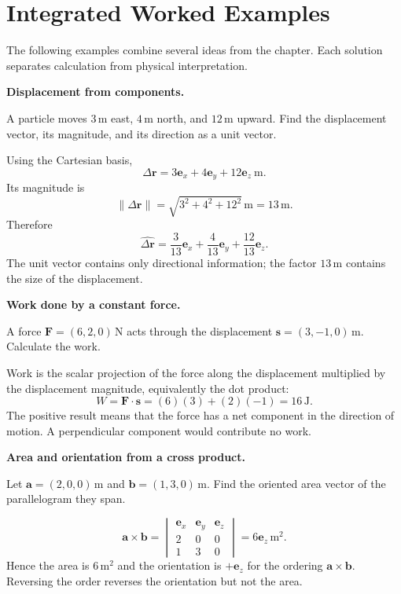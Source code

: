 \section{Integrated Worked Examples}
\label{sec:chapter1-integrated-examples}

The following examples combine several ideas from the chapter. Each solution
separates calculation from physical interpretation.

\begin{workedexample}
\textbf{Displacement from components.}

A particle moves $3\,\mathrm{m}$ east, $4\,\mathrm{m}$ north, and
$12\,\mathrm{m}$ upward. Find the displacement vector, its magnitude, and its
direction as a unit vector.

\begin{solution}
Using the Cartesian basis,
\[
\Delta\mathbf r=3\mathbf e_x+4\mathbf e_y+12\mathbf e_z\ \mathrm{m}.
\]
Its magnitude is
\[
\lVert\Delta\mathbf r\rVert
=\sqrt{3^2+4^2+12^2}\,\mathrm{m}=13\,\mathrm{m}.
\]
Therefore
\[
\widehat{\Delta\mathbf r}
=\frac{3}{13}\mathbf e_x+\frac{4}{13}\mathbf e_y
 +\frac{12}{13}\mathbf e_z.
\]
The unit vector contains only directional information; the factor
$13\,\mathrm{m}$ contains the size of the displacement.
\end{solution}
\end{workedexample}

\begin{workedexample}
\textbf{Work done by a constant force.}

A force $\mathbf F=(6,2,0)\,\mathrm{N}$ acts through the displacement
$\mathbf s=(3,-1,0)\,\mathrm{m}$. Calculate the work.

\begin{solution}
Work is the scalar projection of the force along the displacement multiplied by
the displacement magnitude, equivalently the dot product:
\[
W=\mathbf F\cdot\mathbf s
=(6)(3)+(2)(-1)=16\,\mathrm{J}.
\]
The positive result means that the force has a net component in the direction
of motion. A perpendicular component would contribute no work.
\end{solution}
\end{workedexample}

\begin{workedexample}
\textbf{Area and orientation from a cross product.}

Let $\mathbf a=(2,0,0)\,\mathrm{m}$ and
$\mathbf b=(1,3,0)\,\mathrm{m}$. Find the oriented area vector of the
parallelogram they span.

\begin{solution}
\[
\mathbf a\times\mathbf b
=\begin{vmatrix}
\mathbf e_x&\mathbf e_y&\mathbf e_z\\
2&0&0\\
1&3&0
\end{vmatrix}
=6\mathbf e_z\,\mathrm{m^2}.
\]
Hence the area is $6\,\mathrm{m^2}$ and the orientation is $+\mathbf e_z$ for
the ordering $\mathbf a\times\mathbf b$. Reversing the order reverses the
orientation but not the area.
\end{solution}
\end{workedexample}

